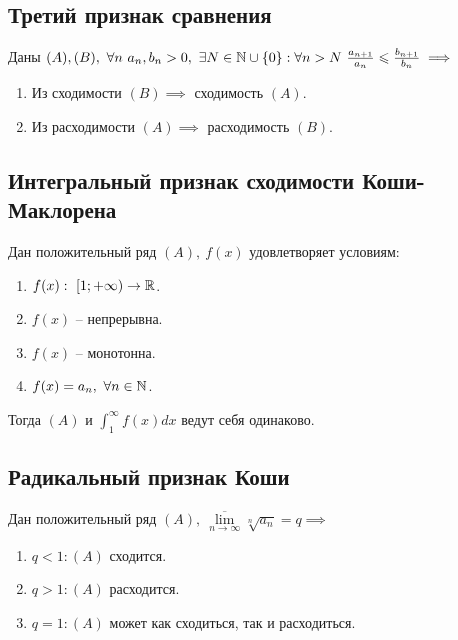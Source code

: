 \newpage

\subsection{Третий признак сравнения}

\begin{theorem}
    Даны $ (A),(B), \ \forall n \ a_n, b_n > 0, \ \exists N \in \N \cup \{0\}: \forall n > N \ \frac{a_{n+1}}{a_n}\leqslant\frac{b_{n+1}}{b_n} \implies$
    \begin{enumerate}
        \item Из сходимости $(B) \implies$ сходимость $(A)$.
        \item Из расходимости $(A) \implies$ расходимость $(B)$.
    \end{enumerate}
\end{theorem}

\subsection{Интегральный признак сходимости Коши-Маклорена}

\begin{theorem}
    Дан положительный ряд $ (A), \ f(x)$ удовлетворяет условиям:
    \begin{enumerate}
        \item $f(x): \ [1;+\infty) \rightarrow\mathbb{R}$.
        \item $f(x)$ -- непрерывна.
        \item $f(x)$ -- монотонна.
        \item $f(x) = a_n, \ \forall n \in \mathbb{N}$.
    \end{enumerate}

    Тогда $(A)$ и $\int_{1}^{\infty}f(x)dx$ ведут себя одинаково.
\end{theorem}

\subsection{Радикальный признак Коши}

\begin{theorem}
    Дан положительный ряд $(A), \ \underset{n\rightarrow\infty}{\overline{\lim}}\sqrt[n]{a_n} = q\implies $
    \begin{enumerate}
        \item $q < 1: (A)$ сходится.
        \item $q > 1: (A)$ расходится.
        \item $q = 1: (A)$ может как сходиться, так и расходиться.
    \end{enumerate}
\end{theorem}

